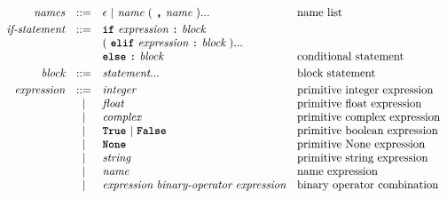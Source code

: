 \[\begin{array}{rcll}
\textit{names}           & ::= & \epsilon\ |\ \textit{name}\ (\ \term{,}\ \textit{name}\ )...                            & \text{name list}                        \\[1mm]
\textit{if-statement}    & ::= & \term{if}\ \textit{expression}\ \term{:}\ \textit{block}                                &                                         \\
                         &     & (\ \term{elif}\ \textit{expression}\ \term{:}\ \textit{block}\ )...                     &                                         \\
                         &     & \term{else}\ \term{:}\ \textit{block}                                                   & \text{conditional statement}            \\[1mm]
\textit{block}           & ::= & \textit{statement}...                                                                   & \text{block statement}                  \\[1mm]
\textit{expression}      & ::= & \textit{integer}                                                                        & \text{primitive integer expression}     \\
                         & |   & \textit{float}                                                                          & \text{primitive float expression}       \\
                         & |   & \textit{complex}                                                                        & \text{primitive complex expression}     \\
                         & |   & \term{True}\ |\ \term{False}                                                            & \text{primitive boolean expression}     \\
                         & |   & \term{None}                                                                             & \text{primitive None expression}        \\
                         & |   & \textit{string}                                                                         & \text{primitive string expression}      \\
                         & |   & \textit{name}                                                                           & \text{name expression}                  \\
                         & |   & \textit{expression}\ \textit{binary-operator}\ \textit{expression}                      & \text{binary operator combination}      \\

\end{array}\]
